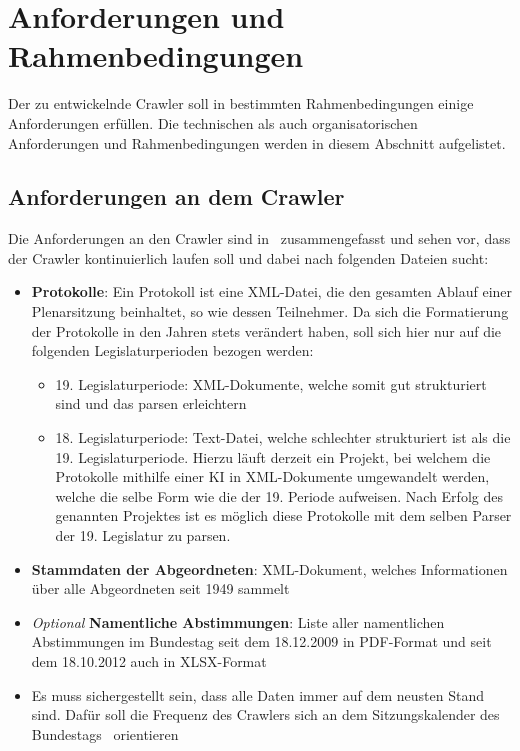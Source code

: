 \section{Anforderungen und Rahmenbedingungen}\label{sec:02_02_anforderungen_rahmen}
Der zu entwickelnde Crawler soll in bestimmten Rahmenbedingungen einige Anforderungen erfüllen. Die technischen als auch organisatorischen Anforderungen und Rahmenbedingungen werden in diesem Abschnitt aufgelistet. 
\subsection{Anforderungen an dem Crawler}\label{subsec:02_02_anforderungen}
Die Anforderungen an den Crawler sind in~\cite{Hoppe2020Uebung} zusammengefasst und sehen vor, dass der Crawler kontinuierlich laufen soll und dabei nach folgenden Dateien sucht:
\begin{itemize}
  \item \textbf{Protokolle}: Ein Protokoll ist eine XML-Datei, die den gesamten Ablauf einer Plenarsitzung beinhaltet, so wie dessen Teilnehmer. Da sich die Formatierung der Protokolle in den Jahren stets verändert haben, soll sich hier nur auf die folgenden Legislaturperioden bezogen werden:
  \begin{itemize}
    \item 19. Legislaturperiode: XML-Dokumente, welche somit gut strukturiert sind und das parsen erleichtern
    \item 18. Legislaturperiode: Text-Datei, welche schlechter strukturiert ist als die 19. Legislaturperiode. Hierzu läuft derzeit ein Projekt, bei welchem die Protokolle mithilfe einer KI in XML-Dokumente umgewandelt werden, welche die selbe Form wie die der 19. Periode aufweisen. Nach Erfolg des genannten Projektes ist es möglich diese Protokolle mit dem selben Parser der 19. Legislatur zu parsen.
  \end{itemize}
  \item \textbf{Stammdaten der Abgeordneten}: XML-Dokument, welches Informationen über alle Abgeordneten seit 1949 sammelt
  \item \textit{Optional} \textbf{Namentliche Abstimmungen}: Liste aller namentlichen Abstimmungen im Bundestag seit dem 18.12.2009 in PDF-Format und seit dem 18.10.2012 auch in XLSX-Format~\cite{NamentlicheAbstimmung20}
  \item Es muss sichergestellt sein, dass alle Daten immer auf dem neusten Stand sind. Dafür soll die Frequenz des Crawlers sich an dem Sitzungskalender des Bundestags~\cite{Sitzungskalender2021} orientieren
\end{itemize}

